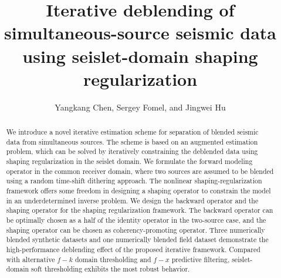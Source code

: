 
\title{Iterative deblending of simultaneous-source seismic data using seislet-domain shaping regularization}
\renewcommand{\thefootnote}{\fnsymbol{footnote}}
\author{Yangkang Chen, Sergey Fomel, and Jingwei Hu}


\address{
Bureau of Economic Geology \\
John A. and Katherine G. Jackson School of Geosciences \\
The University of Texas at Austin \\
University Station, Box X \\
Austin, TX 78713-8924 \\
}

\maketitle

\begin{abstract}
We introduce a novel iterative estimation scheme for separation of blended seismic data from simultaneous sources. The scheme is based on an augmented estimation problem, which can be solved by  iteratively constraining the deblended data using shaping regularization in the seislet domain. We formulate the forward modeling operator in the common receiver domain, where two sources are assumed to be blended using a random time-shift dithering approach. The nonlinear shaping-regularization framework offers some freedom in designing a shaping operator to constrain the model in an underdetermined inverse problem. We design the backward operator and the shaping operator for the shaping regularization framework. The backward operator can be optimally chosen as a half of the identity operator in the two-source case, and the shaping operator can be chosen as coherency-promoting operator. Three numerically blended synthetic datasets and one numerically blended field dataset demonstrate the high-performance deblending effect of the proposed iterative framework. Compared with alternative $f-k$ domain thresholding and $f-x$ predictive filtering, seislet-domain soft thresholding exhibits the most robust behavior.
\end{abstract}

